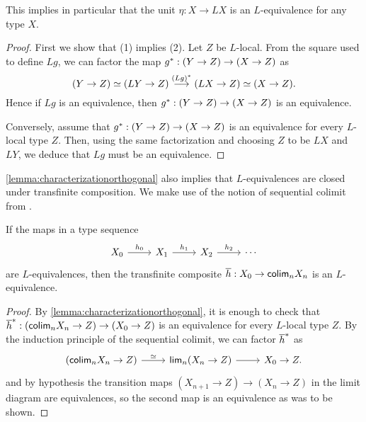 This implies in particular that the unit $\eta : X \to L X$ is an $L$-equivalence for any type $X$.

\begin{proof} First we show that (1) implies (2).
    Let $Z$ be $L$-local. From the square used to define $Lg$,
    we can factor the map ${g}^\ast : (Y \to Z) \to (X \to Z)$ as
    \[
        (Y \to Z) \simeq (L Y \to Z) \stackrel{{(L g)}^\ast}{\longrightarrow} (L X \to  Z) \simeq (X \to Z).
    \]
 Hence if $L g$ is an equivalence, then ${g}^\ast : (Y \to Z) \to (X \to Z)$ is an equivalence.
 
    Conversely, assume that ${g}^\ast : (Y \to Z) \to (X \to Z)$ is an equivalence for every $L$-local type $Z$.
    Then, using the same factorization and choosing $Z$ to be $L X$ and $L Y$, we deduce that $L g$ must be an equivalence.
\end{proof}

\cref{lemma:characterizationorthogonal} also implies that $L$-equivalences are closed under transfinite composition.
We make use of the notion of sequential colimit from \cite[Section 3.1]{Brunerie}.

\begin{lem}\label{lemma:orthogonalcomposition}
    If the maps in a type sequence
\begin{equation*}
\begin{tikzcd}
X_0 \arrow[r,"h_0"] & X_1 \arrow[r,"h_1"] & X_2 \arrow[r,"h_2"] & \cdots
\end{tikzcd}
\end{equation*}
    are $L$-equivalences, then the transfinite composite $\overline{h} : X_0 \to \mathsf{colim}_n X_n$ is an $L$-equiva\-lence.
\end{lem}

\begin{proof}
    By \cref{lemma:characterizationorthogonal}, it is enough to check that
    ${\overline{h}}^\ast : (\mathsf{colim}_n X_n \to Z) \to (X_0 \to Z)$
    is an equivalence for every $L$-local type $Z$.
    By the induction principle of the sequential colimit,
    we can factor ${\overline{h}}^\ast$ as
\begin{equation*}
\begin{tikzcd}
(\colim_n X_n \to Z) \arrow[r,"\eqvsym"] & \mathsf{lim}_n (X_n\to Z) \arrow[r] & X_0\to Z.
\end{tikzcd}
\end{equation*}
    and by hypothesis the transition maps $(X_{n+1} \to Z) \to (X_n \to Z)$ in the limit diagram are equivalences,
    so the second map is an equivalence as was to be shown.
\end{proof}

